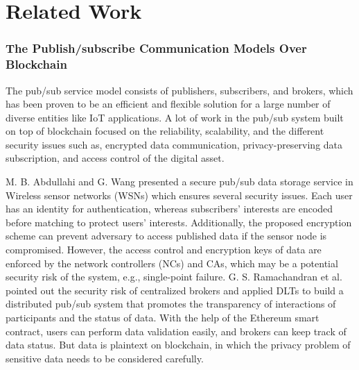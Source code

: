 \newpage
{}
\chapter{Related Work}
\label{section:relatedWork}
\pagestyle{plain}

\begin{spacing}{2.0}

\subsection{The Publish/subscribe Communication Models Over Blockchain}
The pub/sub service model consists of publishers, subscribers, and brokers, which has been proven\cite{pubSubAnalysis, pubSubAnalysis2} to be an efficient and flexible solution for a large number of diverse entities like IoT applications. A lot of work in the pub/sub system built on top of blockchain focused on the reliability, scalability, and the different security issues such as, encrypted data communication, privacy-preserving data subscription, and access control of the digital asset.

M. B. Abdullahi and G. Wang\cite{centralPubSub} presented a secure pub/sub data storage service in Wireless sensor networks (WSNs) which ensures several security issues. Each user has an identity for authentication, whereas subscribers' interests are encoded before matching to protect users' interests. Additionally, the proposed encryption scheme can prevent adversary to access published data if the sensor node is compromised. However, the access control and encryption keys of data are enforced by the network controllers (NCs) and CAs, which may be a potential security risk of the system, e.g., single-point failure. G. S. Ramachandran et al.\cite{trinity} pointed out the security risk of centralized brokers and applied DLTs to build a distributed pub/sub system that promotes the transparency of interactions of participants and the status of data. With the help of the Ethereum smart contract, users can perform data validation easily, and brokers can keep track of data status. But data is plaintext on blockchain, in which the privacy problem of sensitive data needs to be considered carefully.


\end{spacing}
